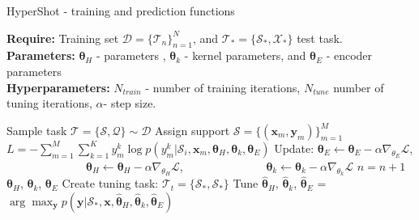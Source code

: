 \documentclass[nohyperref]{article}
\def\our{HyperShot}
\theoremstyle{plain}
\theoremstyle{definition}
\theoremstyle{remark}
\begin{document}
\begin{algorithm}[t]
\small
    \caption{\our{} - training and prediction functions}
    \label{alg_overview}
    \textbf{Require:} Training set $\mathcal{D} = \{\mathcal{T}_n\}^N_{n=1}$, and $\mathcal{T}_{*}=\{\mathcal{S}_{*}, \mathcal{X}_{*}\}$ test task. \\
    \textbf{Parameters:}  $\boldsymbol{\theta}_H$ -  parameters , $\boldsymbol{\theta}_k$ - kernel parameters, and $\boldsymbol{\theta}_E$ - encoder parameters\\ \textbf{Hyperparameters:} $N_{train}$ - number of training iterations, $N_{tune}$ number of tuning iterations, $\alpha$- step size.
    \begin{algorithmic}[1]
        \vspace{0.1cm} 
                \State Sample task $\mathcal{T}=\{\mathcal{S}, \mathcal{Q}\} \sim \mathcal{D}$
                \State Assign support $\mathcal{S}=\{(\mathbf{x}_m,\mathbf{y}_m)\}_{m=1}^M$
                \State $L=-\sum_{m=1}^M \sum_{k=1}^K y_{m}^k \log p(y_{m}^k|\mathcal{S}_i, \mathbf{x}_{m},\boldsymbol{\theta}_H, \boldsymbol{\theta}_k, \boldsymbol{\theta}_E)$
                    \State Update: $\boldsymbol{\theta}_E \leftarrow \boldsymbol{\theta}_E - \alpha \nabla_{\theta_E} \mathcal{L}$,
                    \State \ \ \ \ \ \ \ \ \ \ \ \ \ \ $\boldsymbol{\theta}_H \leftarrow \boldsymbol{\theta}_H - \alpha \nabla_{\theta_H} \mathcal{L}$,
                    \State \ \ \ \ \ \ \ \ \ \ \ \ \ \ $\boldsymbol{\theta}_k \leftarrow \boldsymbol{\theta}_k - \alpha \nabla_{\theta_k} \mathcal{L}$
                    \State $n = n + 1$
            \EndWhile
            \State \Return $\boldsymbol{\theta}_H$, $\boldsymbol{\theta}_k$, $\boldsymbol{\theta}_E$
        \EndFunction
        \vspace{0.1cm} 
            \State Create tuning task: $\mathcal{T}_t=\{\mathcal{S}_{*}, \mathcal{S}_{*}\}$
            \State Tune $\boldsymbol{\hat{\theta}}_H$, $\boldsymbol{\hat{\theta}}_k$, $\boldsymbol{\hat{\theta}}_E$ = 
                \State \Return $\arg \max_{\mathbf{y}} p(\mathbf{y}|\mathcal{S}_{*}, \mathbf{x},\boldsymbol{\hat{\theta}}_H, \boldsymbol{\hat{\theta}}_k, \boldsymbol{\hat{\theta}}_E)$
            \EndFor
\EndFunction
    \end{algorithmic}
\end{algorithm}
\end{document}
